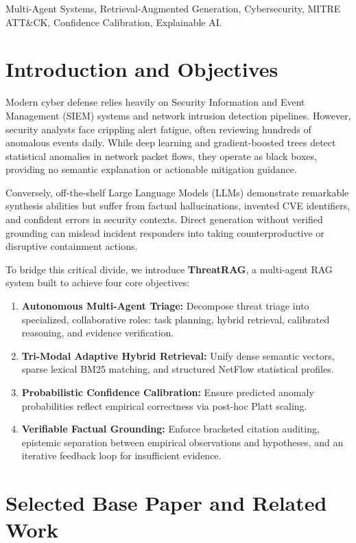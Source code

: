 \documentclass[conference]{IEEEtran}
\begin{document}
\begin{IEEEkeywords}
Multi-Agent Systems, Retrieval-Augmented Generation, Cybersecurity, MITRE ATT\&CK, Confidence Calibration, Explainable AI.
\end{IEEEkeywords}

\section{Introduction and Objectives}
Modern cyber defense relies heavily on Security Information and Event Management (SIEM) systems and network intrusion detection pipelines. However, security analysts face crippling alert fatigue, often reviewing hundreds of anomalous events daily. While deep learning and gradient-boosted trees detect statistical anomalies in network packet flows, they operate as black boxes, providing no semantic explanation or actionable mitigation guidance.

Conversely, off-the-shelf Large Language Models (LLMs) demonstrate remarkable synthesis abilities but suffer from factual hallucinations, invented CVE identifiers, and confident errors in security contexts. Direct generation without verified grounding can mislead incident responders into taking counterproductive or disruptive containment actions.

To bridge this critical divide, we introduce \textbf{ThreatRAG}, a multi-agent RAG system built to achieve four core objectives:
\begin{enumerate}
    \item \textbf{Autonomous Multi-Agent Triage:} Decompose threat triage into specialized, collaborative roles: task planning, hybrid retrieval, calibrated reasoning, and evidence verification.
    \item \textbf{Tri-Modal Adaptive Hybrid Retrieval:} Unify dense semantic vectors, sparse lexical BM25 matching, and structured NetFlow statistical profiles.
    \item \textbf{Probabilistic Confidence Calibration:} Ensure predicted anomaly probabilities reflect empirical correctness via post-hoc Platt scaling.
    \item \textbf{Verifiable Factual Grounding:} Enforce bracketed citation auditing, epistemic separation between empirical observations and hypotheses, and an iterative feedback loop for insufficient evidence.
\end{enumerate}

\section{Selected Base Paper and Related Work}
\end{document}
